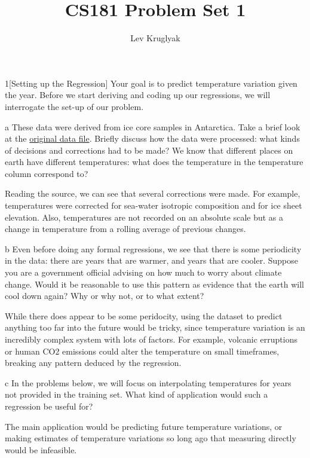 \documentclass[expanded]{lkx_pset}
\title{CS181 Problem Set 1}
\author{Lev Kruglyak}
\begin{document}
\maketitle

\begin{problem}{1}[Setting up the Regression]
  Your goal is to predict temperature variation given the year.  Before we start deriving and coding up our regressions, we will interrogate the set-up of our problem.  
\end{problem}

\begin{parts}
  \begin{part}{a}
    These data were derived from ice core samples in Antarctica.
    Take a brief look at the
    \href{https://www.ncei.noaa.gov/pub/data/paleo/icecore/antarctica/epica_domec/edc3deuttemp2007.txt}{original
      data file}. Briefly discuss how the data were processed: what kinds of
    decisions and corrections had to be made?  We know that different
    places on earth have different temperatures: what does the
    temperature in the temperature column correspond to?
  \end{part}

  Reading the source, we can see that several corrections were made. For example, temperatures were corrected for sea-water isotropic composition and for ice sheet elevation. Also, temperatures are not recorded on an absolute scale but as a change in temperature from a rolling average of previous changes. 

  \begin{part}{b}
    Even before doing any formal regressions, we see that there is
    some periodicity in the data: there are years that are warmer, and
    years that are cooler.  Suppose you are a government official
    advising on how much to worry about climate change.  Would it be
    reasonable to use this pattern as evidence that the earth will
    cool down again?  Why or why not, or to what extent?
  \end{part}
  
  While there does appear to be some peridocity, using the dataset to predict anything too far into the future would be tricky, since temperature variation is an incredibly complex system with lots of factors. For example, volcanic erruptions or human CO2 emissions could alter the temperature on small timeframes, breaking any pattern deduced by the regression.

  \begin{part}{c}
    In the problems below, we will focus on interpolating
    temperatures for years not provided in the training set.  What
    kind of application would such a regression be useful for?
  \end{part}

  The main application would be predicting future temperature variations, or making estimates of temperature variations so long ago that measuring directly would be infeasible.
\end{parts}
\end{document}

